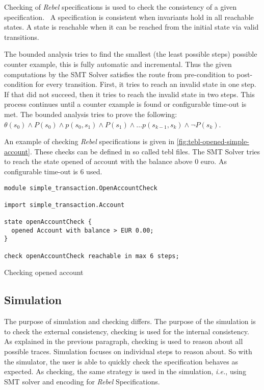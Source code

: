 Checking of \textit{Rebel} specifications is used to check the consistency of a given specification.~\cite[p.~5]{stoel_storm_vinju_bosman_2016} A specification is consistent when invariants hold in all reachable states. A state is reachable when it can be reached from the initial state via valid transitions.

The bounded analysis tries to find the smallest (the least possible steps) possible counter example, this is fully automatic and incremental. Thus the given computations by the SMT Solver satisfies the route from pre-condition to post-condition for every transition.
First, it tries to reach an invalid state in one step. If that did not succeed, then it tries to reach the invalid state in two steps. This process continues until a counter example is found or configurable time-out is met. The bounded analysis tries to prove the following: $\theta (s_{0}) \land P(s_{0}) \land p(s_{0}, s_{1}) \land P(s_{1}) \land \dots p(s_{k-1}, s_{k}) \land \neg P(s_{k})$.

An example of checking \textit{Rebel} specifications is given in \autoref{fig:tebl-opened-simple-account}. These checks can be defined in so called tebl files. The SMT Solver tries to reach the state opened of account with the balance above 0 euro. As configurable time-out is 6 used.

\begin{sourcecode}[h]
\begin{lstlisting}[]
module simple_transaction.OpenAccountCheck

import simple_transaction.Account

state openAccountCheck {
  opened Account with balance > EUR 0.00;
}

check openAccountCheck reachable in max 6 steps;
\end{lstlisting}
\caption{Checking opened account}
\label{fig:tebl-opened-simple-account}
\end{sourcecode}


\subsection{Simulation}
The purpose of simulation and checking differs. The purpose of the simulation is to check the external consistency, checking is used for the internal consistency.~\cite[p.~5]{stoel_storm_vinju_bosman_2016} As explained in the previous paragraph, checking is used to reason about all possible traces. Simulation focuses on individual steps to reason about. So with the simulator, the user is able to quickly check the specification behaves as expected. As checking, the same strategy is used in the simulation, \textit{i.e.}, using SMT solver and encoding for \textit{Rebel} Specifications.
